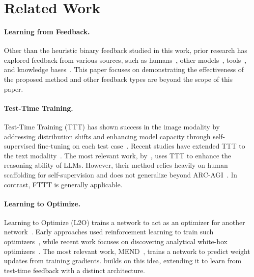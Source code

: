 \section{Related Work}
\paragraph{Learning from Feedback.}

Other than the heuristic binary feedback studied in this work, prior research has explored feedback from various sources, such as humans~\cite{DBLP:conf/nips/Ouyang0JAWMZASR22}, other models~\cite{yang-etal-2022-re3}, tools~\cite{DBLP:conf/nips/SchickDDRLHZCS23}, and knowledge bases~\cite{gao-etal-2023-rarr}. This paper focuses on demonstrating the effectiveness of the proposed method and other feedback types are beyond the scope of this paper.

\paragraph{Test-Time Training.}

Test-Time Training (TTT) has shown success in the image modality by addressing distribution shifts and enhancing model capacity through self-supervised fine-tuning on each test case~\cite{DBLP:conf/icml/SunWLMEH20,DBLP:conf/nips/LiuKDBMA21,DBLP:journals/corr/abs-2310-13807}. Recent studies have extended TTT to the text modality~\cite{DBLP:conf/iclr/Hardt024,DBLP:journals/corr/abs-2401-11504}. The most relevant work, by~\citet{akyürek2024surprisingeffectivenesstesttimetraining}, uses TTT to enhance the reasoning ability of LLMs. However, their method relies heavily on human scaffolding for self-supervision and does not generalize beyond ARC-AGI~\cite{chollet2019measureintelligence}. In contrast, FTTT is generally applicable.

\paragraph{Learning to Optimize.}

Learning to Optimize (L2O) trains a network to act as an optimizer for another network~\cite{DBLP:journals/jmlr/ChenCCH0WY22}. Early approaches used reinforcement learning to train such optimizers~\cite{DBLP:conf/iclr/LiM17,DBLP:conf/icml/ChenHCDLBF17}, while recent work focuses on discovering analytical white-box optimizers~\cite{DBLP:conf/icml/BelloZVL17,DBLP:conf/nips/ChenLHRW0DLHLL23}. The most relevant work, MEND~\cite{DBLP:conf/iclr/MitchellLBFM22}, trains a network to predict weight updates from training gradients. \method{} builds on this idea, extending it to learn from test-time feedback with a distinct architecture.